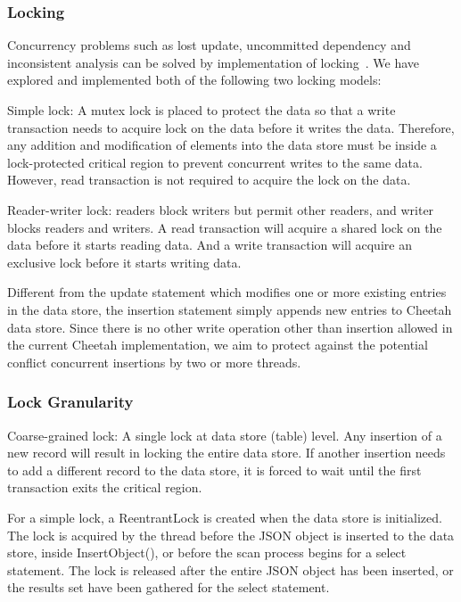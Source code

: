\documentclass[11pt,journal,compsoc]{IEEEtran}
\begin{document}
\subsubsection{Locking}
Concurrency problems such as lost update, uncommitted dependency and inconsistent analysis can be solved by implementation of locking~\cite{krueger2010data}\cite{garcia1992main}. We have explored and implemented both of the following two locking models:
 
Simple lock: A mutex lock is placed to protect the data so that a write transaction needs to acquire lock on the data before it writes the data. Therefore, any addition and modification of elements into the data store must be inside a lock-protected critical region to prevent concurrent writes to the same data. However, read transaction is not required to acquire the lock on the data.
 
Reader-writer lock: readers block writers but permit other readers, and writer blocks readers and writers. A read transaction will acquire a shared lock on the data before it starts reading data. And a write transaction will acquire an exclusive lock before it starts writing data.
 
Different from the update statement which modifies one or more existing entries in the data store, the insertion statement simply appends new entries to Cheetah data store. Since there is no other write operation other than insertion allowed in the current Cheetah implementation, we aim to protect against the potential conflict concurrent insertions by two or more threads.

\subsubsection{Lock Granularity}
Coarse-grained lock: A single lock at data store (table) level. Any insertion of a new record will result in locking the entire data store. If another insertion needs to add a different record to the data store, it is forced to wait until the first transaction exits the critical region.
 
For a simple lock, a ReentrantLock is created when the data store is initialized. The lock is acquired by the thread before the JSON object is inserted to the data store, inside InsertObject(), or before the scan process begins for a select statement.  The lock is released after the entire JSON object has been inserted, or the results set have been gathered for the select statement.
\end{document}
